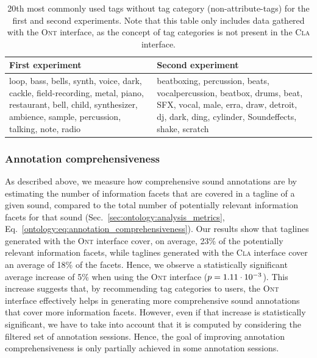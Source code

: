 \begin{table}
\begin{center}
\footnotesize
\begin{tabular}{@{}p{6cm}p{6cm}@{}}
\toprule
\textbf{First experiment} & \textbf{Second experiment} \\
\midrule
loop, bass, bells, synth, voice, dark, cackle, field-recording, metal, piano, restaurant, bell, child, synthesizer, ambience, sample, percussion, talking, note, radio &
beatboxing, percussion, beats, vocalpercussion, beatbox, drums, beat, SFX, vocal, male, erra, draw, detroit, dj, dark, ding, cylinder, Soundeffects, shake, scratch \\
\bottomrule
\end{tabular}
\caption[Most commonly used tags without tag category]{20th most commonly used tags without tag category (non-attribute-tags) for the first and second experiments. Note that this table only includes data gathered with the \textsc{Ont} interface, as the concept of tag categories is not present in the \textsc{Cla} interface.}
\label{tab:ontology_most_common_non_attribute_tags}
\end{center}
\end{table}


\subsubsection{Annotation comprehensiveness}



As described above, we measure how comprehensive sound annotations are by estimating the number of information facets that are covered in a tagline of a given sound, compared to the total number of potentially relevant information facets for that sound (Sec.~\ref{sec:ontology:analysis_metrics}, Eq.~\ref{ontology:eq:annotation_comprehensiveness}).
Our results show that taglines generated with the \textsc{Ont} interface cover, on average, 23\% of the potentially relevant information facets, while taglines generated with the \textsc{Cla} interface cover an average of 18\% of the facets. Hence, we observe a statistically significant average increase of 5\% when using the \textsc{Ont} interface ($p = 1.11\cdot 10^{-3}$).
This increase suggests that, by recommending tag categories to users, the \textsc{Ont} interface effectively helps in generating more comprehensive sound annotations that cover more information facets.
However, even if that increase is statistically significant, we have to take into account that it is computed by considering the filtered set of annotation sessions.
Hence, the goal of improving annotation comprehensiveness is only partially achieved in some annotation sessions.


